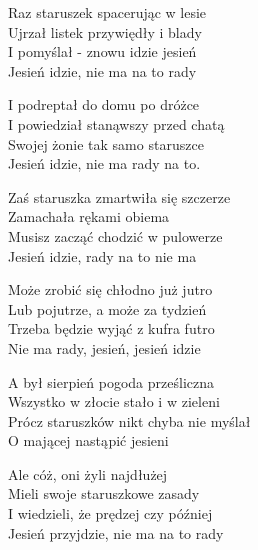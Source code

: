 \begin{textn}
    \hfill\break
    Raz staruszek spacerując w lesie\\
    Ujrzał listek przywiędły i blady\\
    I pomyślał - znowu idzie jesień\\
    Jesień idzie, nie ma na to rady

    \vin I podreptał do domu po dróżce\\
    \vin I powiedział stanąwszy przed chatą\\
    \vin Swojej żonie tak samo staruszce\\
    \vin Jesień idzie, nie ma rady na to.

    Zaś staruszka zmartwiła się szczerze\\
    Zamachała rękami obiema\\
    Musisz zacząć chodzić w pulowerze\\
    Jesień idzie, rady na to nie ma

    \vin Może zrobić się chłodno już jutro\\
    \vin Lub pojutrze, a może za tydzień\\
    \vin Trzeba będzie wyjąć z kufra futro\\
    \vin Nie ma rady, jesień, jesień idzie

    A był sierpień pogoda prześliczna\\
    Wszystko w złocie stało i w zieleni\\
    Prócz staruszków nikt chyba nie myślał\\
    O mającej nastąpić jesieni

    \vin Ale cóż, oni żyli najdłużej\\
    \vin Mieli swoje staruszkowe zasady\\
    \vin I wiedzieli, że prędzej czy później\\
    \vin Jesień przyjdzie, nie ma na to rady
\end{textn}

